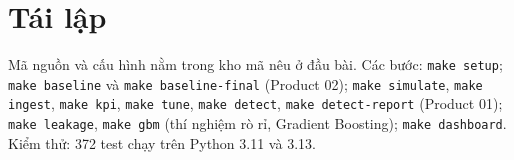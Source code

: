 \documentclass[11pt,a4paper]{article}
\theoremstyle{definition}
\theoremstyle{remark}
\newcommand{\code}[1]{\texttt{#1}}
\numberwithin{equation}{section}
\begin{document}
\appendix
\section{Tái lập}
Mã nguồn và cấu hình nằm trong kho mã nêu ở đầu bài. Các bước: \code{make setup}; \code{make baseline} và \code{make baseline-final} (Product 02); \code{make simulate}, \code{make ingest}, \code{make kpi}, \code{make tune}, \code{make detect}, \code{make detect-report} (Product 01); \code{make leakage}, \code{make gbm} (thí nghiệm rò rỉ, Gradient Boosting); \code{make dashboard}. Kiểm thử: 372 test chạy trên Python 3.11 và 3.13.
\end{document}
